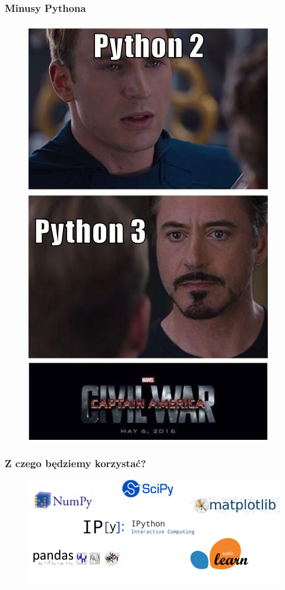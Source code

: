 \documentclass[17pt]{beamer}
\begin{document}
\begin{frame}
\frametitle{Minusy Pythona}
\begin{figure}[ht]
\includegraphics[scale=0.3]{./war.jpeg}
\end{figure}
\end{frame}

\begin{frame}
\frametitle{Z czego będziemy korzystać?}
\begin{figure}[ht]
\includegraphics[scale=0.3]{./modules.png}
\end{figure}
\end{frame}
\end{document}
